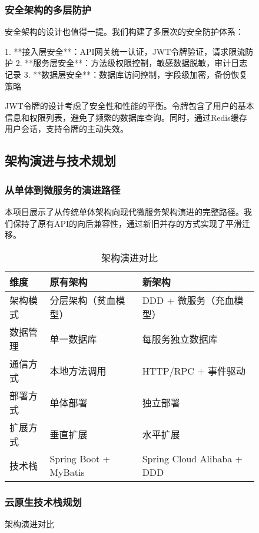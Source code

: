 \documentclass[a4paper,12pt]{article}
\begin{document}
\begin{figure}[H]
\subsubsection{安全架构的多层防护}

安全架构的设计也值得一提。我们构建了多层次的安全防护体系：

1. **接入层安全**：API网关统一认证，JWT令牌验证，请求限流防护
2. **服务层安全**：方法级权限控制，敏感数据脱敏，审计日志记录
3. **数据层安全**：数据库访问控制，字段级加密，备份恢复策略

JWT令牌的设计考虑了安全性和性能的平衡。令牌包含了用户的基本信息和权限列表，避免了频繁的数据库查询。同时，通过Redis缓存用户会话，支持令牌的主动失效。

\subsection{架构演进与技术规划}

\subsubsection{从单体到微服务的演进路径}

本项目展示了从传统单体架构向现代微服务架构演进的完整路径。我们保持了原有API的向后兼容性，通过新旧并存的方式实现了平滑迁移。

\begin{table}[H]
\centering
\caption{架构演进对比}
\begin{tabular}{|p{3cm}|p{5cm}|p{5cm}|}
\hline
\textbf{维度} & \textbf{原有架构} & \textbf{新架构} \\
\hline
架构模式 & 分层架构（贫血模型） & DDD + 微服务（充血模型） \\
\hline
数据管理 & 单一数据库 & 每服务独立数据库 \\
\hline
通信方式 & 本地方法调用 & HTTP/RPC + 事件驱动 \\
\hline
部署方式 & 单体部署 & 独立部署 \\
\hline
扩展方式 & 垂直扩展 & 水平扩展 \\
\hline
技术栈 & Spring Boot + MyBatis & Spring Cloud Alibaba + DDD \\
\hline
\end{tabular}
\end{table}

\subsubsection{云原生技术栈规划}


\end{figure}
\end{document}
